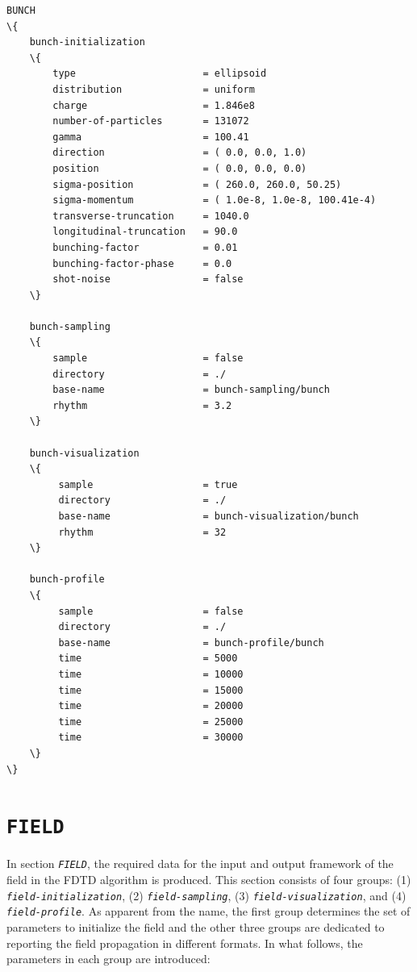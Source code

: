 \begin{snugshade}
\begin{Verbatim}[fontsize=\small, tabsize=4, fontfamily=courier, fontseries=b, commandchars=\\\{\}, obeytabs]
BUNCH
\{
	bunch-initialization
	\{
		type					  = ellipsoid
		distribution			  = uniform
		charge					  = 1.846e8
		number-of-particles 	  = 131072
		gamma					  = 100.41
		direction				  = ( 0.0, 0.0, 1.0)
		position				  = ( 0.0, 0.0, 0.0)
		sigma-position			  = ( 260.0, 260.0, 50.25)
		sigma-momentum			  = ( 1.0e-8, 1.0e-8, 100.41e-4)
		transverse-truncation	  = 1040.0
		longitudinal-truncation	  = 90.0
		bunching-factor			  = 0.01
		bunching-factor-phase	  = 0.0
		shot-noise				  = false
  	\}

	bunch-sampling
	\{
		sample					  = false
		directory				  = ./
		base-name				  = bunch-sampling/bunch
		rhythm					  = 3.2
	\}
	
	bunch-visualization
	\{
		 sample					  = true
		 directory				  = ./
		 base-name				  = bunch-visualization/bunch
		 rhythm					  = 32
	\}
	
	bunch-profile
	\{
		 sample					  = false
		 directory				  = ./
		 base-name				  = bunch-profile/bunch
		 time					  = 5000
		 time					  = 10000
		 time					  = 15000
		 time					  = 20000
		 time					  = 25000
		 time					  = 30000
	\}
\}
\end{Verbatim}
\end{snugshade}

\section{\texttt{FIELD}}

In section {\tt \small \em FIELD}, the required data for the input and output framework of the field in the FDTD algorithm is produced.
%
This section consists of four groups: (1) {\tt \small \em field-initialization}, (2) {\tt \small \em field-sampling}, (3) {\tt \small \em field-visualization}, and (4) {\tt \small \em field-profile}.
%
As apparent from the name, the first group determines the set of parameters to initialize the field and the other three groups are dedicated to reporting the field propagation in different formats.
%
In what follows, the parameters in each group are introduced:

